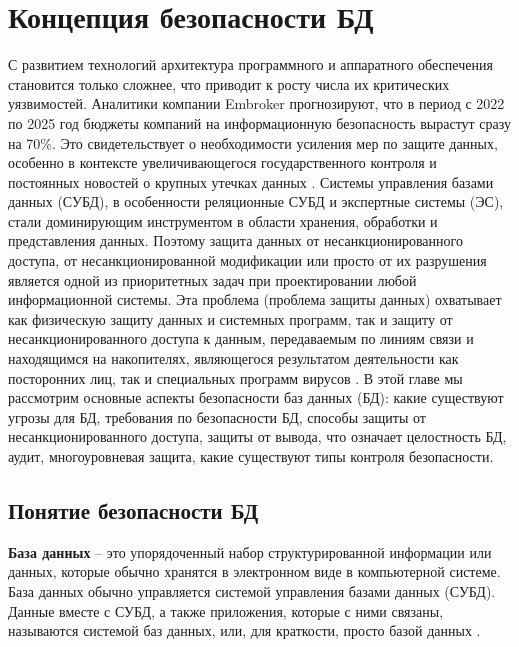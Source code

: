 \section{Концепция безопасности БД}
С развитием технологий архитектура программного и аппаратного обеспечения становится только сложнее, что приводит к росту числа их критических уязвимостей. Аналитики компании Embroker прогнозируют, что в период с 2022 по 2025 год бюджеты компаний на информационную безопасность вырастут сразу на 70\%. Это свидетельствует о необходимости усиления мер по защите данных, особенно в контексте увеличивающегося государственного контроля и постоянных новостей о крупных утечках данных \autocite{DataProtectionMaterials}.
Системы управления базами данных (СУБД), в особенности реляционные СУБД и экспертные системы (ЭС), стали доминирующим инструментом в области хранения, обработки и представления данных. Поэтому защита данных от несанкционированного доступа, от несанкционированной модификации или просто от их разрушения является одной из приоритетных задач при проектировании любой информационной системы. Эта проблема (проблема защиты данных) охватывает как физическую защиту данных и системных программ, так и защиту от несанкционированного доступа к данным, передаваемым по линиям связи и находящимся на накопителях, являющегося результатом деятельности как посторонних лиц, так и специальных программ вирусов \autocite[с. 6]{Skakun}.
В этой главе мы рассмотрим основные аспекты безопасности баз данных (БД): какие существуют угрозы для БД, требования по безопасности БД, способы защиты от несанкционированного доступа, защиты от вывода, что означает целостность БД, аудит, многоуровневая защита, какие существуют типы контроля безопасности.

\subsection{Понятие безопасности БД}\label{sec:concept_security_db}

\begin{grayquote}
	\textbf{База данных} -- это упорядоченный набор структурированной информации или данных, которые обычно хранятся в электронном виде в компьютерной системе. База данных обычно управляется системой управления базами данных (СУБД). Данные вместе с СУБД, а также приложения, которые с ними связаны, называются системой баз данных, или, для краткости, просто базой данных \autocite{oracleWhatIsDatabase}.
\end{grayquote}


